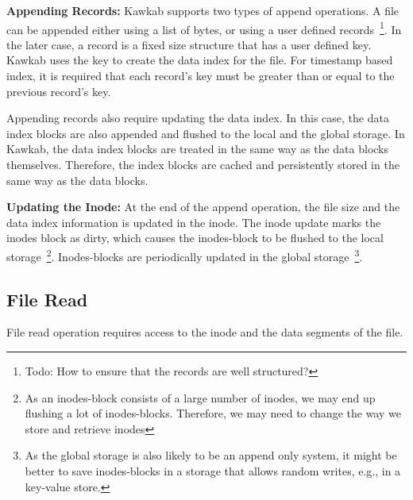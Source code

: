 \documentclass[]{article}
\newcommand{\subtopic}[1]{\vspace{1.5pt} \noindent \textbf{#1}}
\begin{document}
\subtopic{Appending Records:} Kawkab supports two types of append operations. A
file can be appended either using a list of bytes, or using a user defined
records~\footnote{Todo: How to ensure that the records are well structured?}.
In the later case, a record is a fixed size structure that has a user defined
key. Kawkab uses the key to create the data index for the file. For timestamp
based index, it is required that each record's key must be greater than or
equal to the previous record's key.

Appending records also require updating the data index. In this case, the
data index blocks are also appended and flushed to the local and the
global storage. In Kawkab, the data index blocks are treated in the
same way as the data blocks themselves. Therefore, the index blocks
are cached and persistently stored in the same way as the data blocks.


\subtopic{Updating the Inode:} At the end of the append operation, the file
size and the data index information is updated in the inode. The inode
update marks the inodes block as dirty, which causes the inodes-block
to be flushed to the local storage~\footnote{As an inodes-block consists of
a large number of inodes, we may end up flushing a lot of inodes-blocks. Therefore,
we may need to change the way we store and retrieve inodes}. Inodes-blocks
are periodically updated in the global storage~\footnote{As the global storage
is also likely to be an append only system, it might be better to save inodes-blocks
in a storage that allows random writes, e.g., in a key-value store.}.




\subsection{File Read}

File read operation requires access to the inode and the data segments of the
file. 
\end{document}
